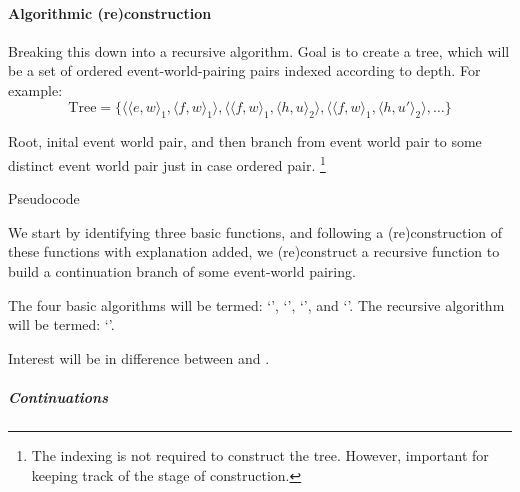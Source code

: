 \paragraph{Algorithmic (re)construction}

\begin{note}
  Breaking this down into a recursive algorithm.
  Goal is to create a tree, which will be a set of ordered event-world-pairing pairs indexed according to depth.
  For example:
  \[\text{Tree} = \{\langle \langle e,w \rangle_{1}, \langle f,w \rangle_{1} \rangle, \langle \langle f,w \rangle_{1}, \langle h,u \rangle_{2} \rangle, \langle \langle f,w \rangle_{1}, \langle h,u' \rangle_{2} \rangle, \dots \}\]

  Root, inital event world pair, and then branch from event world pair to some distinct event world pair just in case ordered pair.
  \footnote{
    The indexing is not required to construct the tree.
    However, important for keeping track of the stage of construction.
  }

  {\color{red} Pseudocode}
  \nocite{Cormen:2009uw}

  We start by identifying three basic functions, and following a (re)construction of these functions with explanation added, we (re)construct a recursive function to build a continuation branch of some event-world pairing.

  The four basic algorithms will be termed:
  `\AlgAC{}', `\AlgGetStops{}', `\AlgGetPStops{}', and `\AlgFindBranches{}'.
  The recursive algorithm will be termed:
  `\AlgDevelopTree{}'.

  Interest will be in difference between \AlgGetStops{} and \AlgGetPStops{}.
\end{note}

\subparagraph{Continuations}

